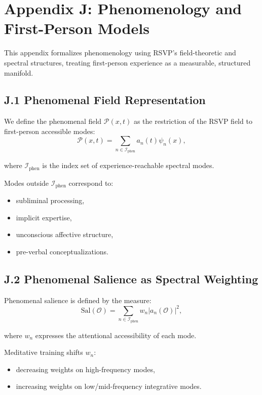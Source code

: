 \documentclass[12pt]{article}
\begin{document}

\section*{Appendix J: Phenomenology and First-Person Models}

This appendix formalizes phenomenology using RSVP’s field-theoretic and
spectral structures, treating first-person experience as a measurable,
structured manifold.

\subsection*{J.1 Phenomenal Field Representation}

We define the phenomenal field $\mathcal{P}(x,t)$ as the restriction of the
RSVP field to first-person accessible modes:
\[
\mathcal{P}(x,t)
=
\sum_{n \in \mathcal{I}_{\text{phen}}}
    a_n(t)\psi_n(x),
\]

where $\mathcal{I}_{\text{phen}}$ is the index set of experience-reachable
spectral modes.

Modes outside $\mathcal{I}_{\text{phen}}$ correspond to:
\begin{itemize}
\item subliminal processing,
\item implicit expertise,
\item unconscious affective structure,
\item pre-verbal conceptualizations.
\end{itemize}

\subsection*{J.2 Phenomenal Salience as Spectral Weighting}

Phenomenal salience is defined by the measure:
\[
\mathrm{Sal}(\mathcal{O})
=
\sum_{n \in \mathcal{I}_{\text{phen}}}
    w_n |a_n(\mathcal{O})|^2,
\]

where $w_n$ expresses the attentional accessibility of each mode.

Meditative training shifts $w_n$:
\begin{itemize}
\item decreasing weights on high-frequency modes,
\item increasing weights on low/mid-frequency integrative modes.
\end{itemize}
\end{document}

